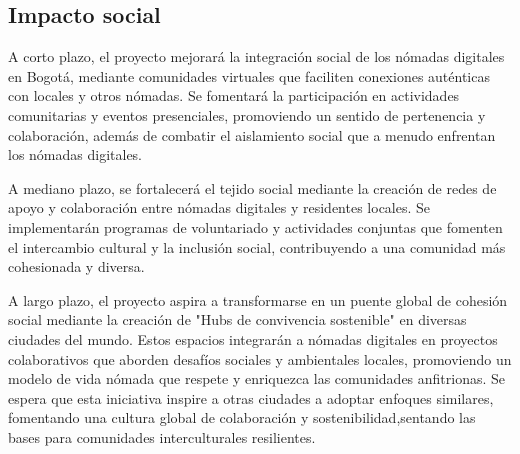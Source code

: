 \subsection{Impacto social}

A corto plazo, el proyecto mejorará la integración social de los nómadas digitales en Bogotá, mediante comunidades virtuales que faciliten conexiones auténticas con locales y otros nómadas. Se fomentará la participación en actividades comunitarias y eventos presenciales, promoviendo un sentido de pertenencia y colaboración, además de combatir el aislamiento social que a menudo enfrentan los nómadas digitales.

A mediano plazo, se fortalecerá el tejido social mediante la creación de redes de apoyo y colaboración entre nómadas digitales y residentes locales. Se implementarán programas de voluntariado y actividades conjuntas que fomenten el intercambio cultural y la inclusión social, contribuyendo a una comunidad más cohesionada y diversa.

A largo plazo, el proyecto aspira a transformarse en un puente global de cohesión social mediante la creación de "Hubs de convivencia sostenible" en diversas ciudades del mundo. Estos espacios integrarán a nómadas digitales en proyectos colaborativos que aborden desafíos sociales y ambientales locales, promoviendo un modelo de vida nómada que respete y enriquezca las comunidades anfitrionas. Se espera que esta iniciativa inspire a otras ciudades a adoptar enfoques similares, fomentando una cultura global de colaboración y sostenibilidad,sentando las bases para comunidades interculturales resilientes.


